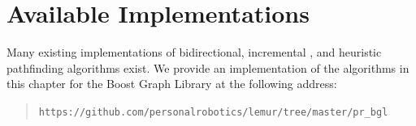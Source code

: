 \section{Available Implementations}

Many existing implementations of bidirectional,
incremental \citep{alberts1998softwaredynamicgraph},
and heuristic \citep{likhachev2008sbpl}
pathfinding algorithms exist.
We provide an implementation of the algorithms in this chapter
for the Boost Graph Library \citep{siek2001boostgraph}
at the following address:
\begin{quote}
   \texttt{https://github.com/personalrobotics/lemur/tree/master/pr\_bgl}
\end{quote}


%   
%   

